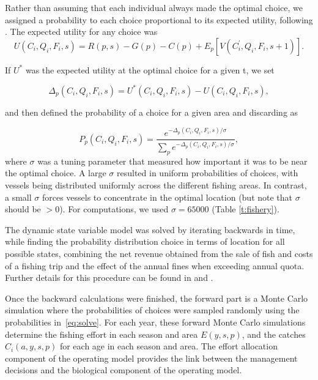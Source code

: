 \documentclass[12pt,oneline,a4paper,numbib]{ouparticle}
\numberwithin{equation}{subsection} %
\begin{document}
Rather than assuming that each individual always made the optimal choice, we assigned a probability to each choice proportional to its expected utility, following \cite{Dowling2011}. The expected utility for any choice was
\begin{equation}
U (C_i, Q_i, F_i, s) = R(p, s)- G(p) - C(p) + E_{p}[V (C_i^\prime, Q_i, F_i, s+1)].
\end{equation}

If $U^*$ was the expected utility at the optimal choice for a given t, we set

\begin{equation}
\Delta_{p}(C_i, Q_i, F_i, s) =  U^* (C_i, Q_i, F_i, s) - U (C_i, Q_i, F_i, s),
\end{equation}

and then defined the probability of a choice for a given area and discarding as	

\begin{equation} \label{eq:solve}
P_{p}(C_i, Q_i, F_i, s) = \frac
                {e^{ -\Delta_{p}(C_i, Q_i, F_i, s)/\sigma}}
                {\sum_p e^{ -\Delta_{p}(C_i, Q_i, F_i, s)/\sigma}},
\end{equation}
where $\sigma$ was a tuning parameter that measured how important it was to be near the optimal choice. A large $\sigma$ resulted in uniform probabilities of choices, with vessels being distributed uniformly across the different fishing areas. In contrast, a small $\sigma$ forces vessels to concentrate in the optimal location (but note that $\sigma$ should be $> 0$). For computations, we used $\sigma = 65000$ (Table \ref{t:fishery}). %

The dynamic state variable model was solved by iterating backwards in time, while finding the probability distribution choice in terms of location for all possible states, combining the net revenue obtained from the sale of fish and costs of a fishing trip and the effect of the annual fines when exceeding annual quota. Further details for this procedure can be found in \cite{Alzorriz2018, Batsleer2016} and \cite{Dowling2011}.

Once the backward calculations were finished, the forward part is a Monte Carlo simulation where the probabilities of choices were sampled randomly using the probabilities in~\ref{eq:solve}. For each year, these forward Monte Carlo simulations determine the fishing effort in each season and area $E(y,s,p)$, and the catches $C_i (a, y, s, p)$ for each age in each season and area. The effort allocation component of the operating model provides the link between the management decisions and the biological component of the operating model.
\end{document}

